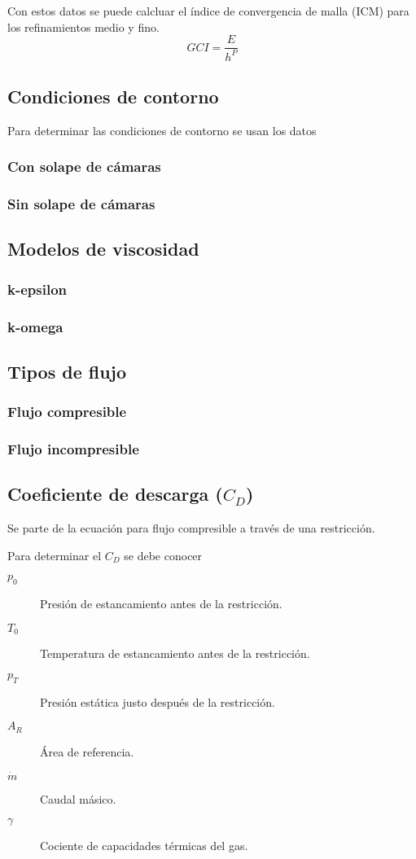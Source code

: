 Con estos datos se puede calcluar el índice de convergencia de malla (ICM) para
los refinamientos medio y fino.
$$ GCI = \frac{E}{h^P} $$

\subsection{Condiciones de contorno}
Para determinar las condiciones de contorno se usan los datos 
\subsubsection{Con solape de cámaras}
\subsubsection{Sin solape de cámaras}

\subsection{Modelos de viscosidad}
\subsubsection{k-epsilon}
\subsubsection{k-omega}

\subsection{Tipos de flujo}
\subsubsection{Flujo compresible}
\subsubsection{Flujo incompresible}

\subsection{Coeficiente de descarga ($C_D$)}

Se parte de la ecuación para flujo compresible a través de una restricción.

Para determinar el $C_D$ se debe conocer

\begin{description}
    \item[$p_0$] Presión de estancamiento antes de la restricción.
    \item[$T_0$] Temperatura de estancamiento antes de la restricción.
    \item[$p_T$] Presión estática justo después de la restricción.
    \item[$A_R$] Área de referencia.
    \item[$\dot{m}$] Caudal másico.
    \item[$\gamma$] Cociente de capacidades térmicas del gas.
\end{description}

